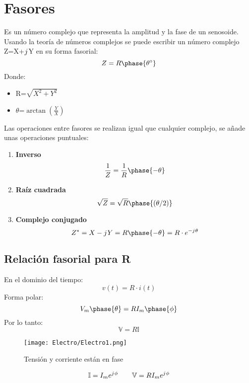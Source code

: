 \documentclass[
	12pt, %
	fleqn, %
	a4paper, %
	oneside, %
]{LegrandOrangeBook}
\begin{document}
\section{Fasores}
\begin{definition}[Fasor]
Es un número complejo que representa la amplitud y la fase de un senosoide.\\Usando la teoría de números complejos se puede escribir un número complejo Z=X+${j\mkern1mu}$Y en su forma fasorial:
\begin{equation}
Z=R\phase{\theta^{\circ}}
\end{equation}
Donde:
\begin{itemize}
\item R=$\sqrt{X^2+Y^2}$
\item $\theta$=$\arctan\left(\frac{Y}{X}\right)$
\end{itemize}
\end{definition}
Las operaciones entre fasores se realizan igual que cualquier complejo, se añade unas operaciones puntuales:
\begin{enumerate}
\item \textbf{Inverso}
\begin{displaymath}
\frac{1}{Z}=\frac{1}{R}\phase{-\theta}
\end{displaymath}
\item \textbf{Raíz cuadrada}
\begin{displaymath}
\sqrt{Z}=\sqrt{R}\phase{(\theta/2)}
\end{displaymath}
\item \textbf{Complejo conjugado}
\begin{displaymath}
Z^*=X-\iu Y=R\phase{-\theta}=R\cdot e^{-\iu\theta}
\end{displaymath}
\end{enumerate}
\subsection{Relación fasorial para R}
En el dominio del tiempo:
\begin{displaymath}
v(t)=R\cdot i(t)
\end{displaymath}
Forma polar:
\begin{displaymath}
V_m\phase{\theta}=RI_m\phase{\phi}
\end{displaymath}
Por lo tanto:
\begin{displaymath}
\mathbb{V}=R\mathbb{I}
\end{displaymath}
\begin{figure}[H]
\centering
\texttt{[image: Electro/Electro1.png]}
\caption{Tensión y corriente están en fase}
\end{figure}
\begin{equation*}
\mathbb{I}=I_me^{{j\mkern1mu}\phi}
\qquad
\mathbb{V}=RI_me^{{j\mkern1mu}\phi}
\end{equation*}
\end{document}
